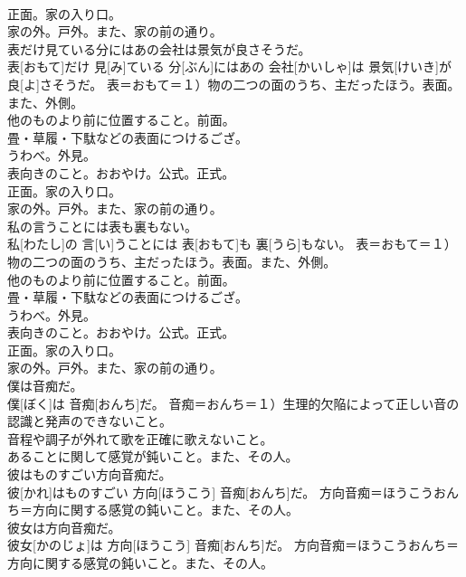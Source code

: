 \documentclass[8pt]{extreport}
\begin{document}
\begin{CJK}{UTF8}{min}
{\\	正面。家の入り口。 　　　　　　
\\	家の外。戸外。また、家の前の通り。
\\	表だけ見ている分にはあの会社は景気が良さそうだ。	
\\	表[おもて]だけ 見[み]ている 分[ぶん]にはあの 会社[かいしゃ]は 景気[けいき]が 良[よ]さそうだ。	表＝おもて＝１）物の二つの面のうち、主だったほう。表面。また、外側。 　　　　　　
\\	他のものより前に位置すること。前面。 　　　　　　
\\	畳・草履・下駄などの表面につけるござ。 　　　　　　
\\	うわべ。外見。 　　　　　　
\\	表向きのこと。おおやけ。公式。正式。 　　　　　　
\\	正面。家の入り口。 　　　　　　
\\	家の外。戸外。また、家の前の通り。
\\	私の言うことには表も裏もない。	
\\	私[わたし]の 言[い]うことには 表[おもて]も 裏[うら]もない。	表＝おもて＝１）物の二つの面のうち、主だったほう。表面。また、外側。 　　　　　　
\\	他のものより前に位置すること。前面。 　　　　　　
\\	畳・草履・下駄などの表面につけるござ。 　　　　　　
\\	うわべ。外見。 　　　　　　
\\	表向きのこと。おおやけ。公式。正式。 　　　　　　
\\	正面。家の入り口。 　　　　　　
\\	家の外。戸外。また、家の前の通り。
\\	僕は音痴だ。	
\\	僕[ぼく]は 音痴[おんち]だ。	音痴＝おんち＝１）生理的欠陥によって正しい音の認識と発声のできないこと。 　　　　　　　
\\	音程や調子が外れて歌を正確に歌えないこと。 　　　　　　　
\\	あることに関して感覚が鈍いこと。また、その人。
\\	彼はものすごい方向音痴だ。	
\\	彼[かれ]はものすごい 方向[ほうこう] 音痴[おんち]だ。	方向音痴＝ほうこうおんち＝方向に関する感覚の鈍いこと。また、その人。
\\	彼女は方向音痴だ。	
\\	彼女[かのじょ]は 方向[ほうこう] 音痴[おんち]だ。	方向音痴＝ほうこうおんち＝方向に関する感覚の鈍いこと。また、その人。
}
\end{CJK}
\end{document}

